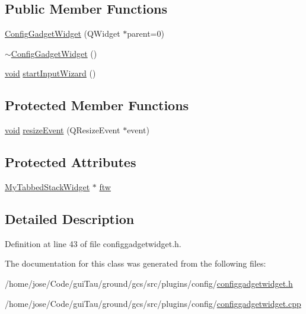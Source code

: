 \subsection*{Public Member Functions}
\begin{DoxyCompactItemize}
\item 
\hyperlink{group___config_plugin_gafc45c197f2917c39166b7d228d592784}{Config\-Gadget\-Widget} (Q\-Widget $\ast$parent=0)
\item 
\hyperlink{group___config_plugin_gaeafab35f30d35ed548cda276953b8ad5}{$\sim$\-Config\-Gadget\-Widget} ()
\item 
\hyperlink{group___u_a_v_objects_plugin_ga444cf2ff3f0ecbe028adce838d373f5c}{void} \hyperlink{group___config_plugin_ga8655bea31bbed90a46bacb2f428301f6}{start\-Input\-Wizard} ()
\end{DoxyCompactItemize}
\subsection*{Protected Member Functions}
\begin{DoxyCompactItemize}
\item 
\hyperlink{group___u_a_v_objects_plugin_ga444cf2ff3f0ecbe028adce838d373f5c}{void} \hyperlink{group___config_plugin_ga62d98ed212936a33d9e9240f27aa7497}{resize\-Event} (Q\-Resize\-Event $\ast$event)
\end{DoxyCompactItemize}
\subsection*{Protected Attributes}
\begin{DoxyCompactItemize}
\item 
\hyperlink{class_my_tabbed_stack_widget}{My\-Tabbed\-Stack\-Widget} $\ast$ \hyperlink{group___config_plugin_ga86b1da74559f7e5f1e68bf0360b06dc5}{ftw}
\end{DoxyCompactItemize}


\subsection{Detailed Description}


Definition at line 43 of file configgadgetwidget.\-h.



The documentation for this class was generated from the following files\-:\begin{DoxyCompactItemize}
\item 
/home/jose/\-Code/gui\-Tau/ground/gcs/src/plugins/config/\hyperlink{configgadgetwidget_8h}{configgadgetwidget.\-h}\item 
/home/jose/\-Code/gui\-Tau/ground/gcs/src/plugins/config/\hyperlink{configgadgetwidget_8cpp}{configgadgetwidget.\-cpp}\end{DoxyCompactItemize}
